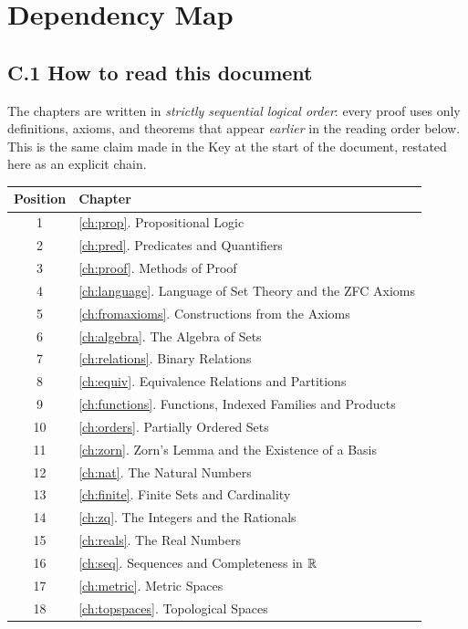 \chapter{Dependency Map}\label{ch:dependency}

\section*{C.1 How to read this document}

The chapters are written in \emph{strictly sequential logical order}: every proof uses only definitions, axioms, and theorems that appear \emph{earlier} in the reading order below. This is the same claim made in the Key at the start of the document, restated here as an explicit chain.

\begin{center}
\begin{tabular}{@{}cl@{}}
	\toprule
	\textbf{Position} & \textbf{Chapter}\\
	\midrule
	1 & \ref{ch:prop}. Propositional Logic\\
	2 & \ref{ch:pred}. Predicates and Quantifiers\\
	3 & \ref{ch:proof}. Methods of Proof\\
	4 & \ref{ch:language}. Language of Set Theory and the ZFC Axioms\\
	5 & \ref{ch:fromaxioms}. Constructions from the Axioms\\
	6 & \ref{ch:algebra}. The Algebra of Sets\\
	7 & \ref{ch:relations}. Binary Relations\\
	8 & \ref{ch:equiv}. Equivalence Relations and Partitions\\
	9 & \ref{ch:functions}. Functions, Indexed Families and Products\\
	10 & \ref{ch:orders}. Partially Ordered Sets\\
	11 & \ref{ch:zorn}. Zorn's Lemma and the Existence of a Basis\\
	12 & \ref{ch:nat}. The Natural Numbers\\
	13 & \ref{ch:finite}. Finite Sets and Cardinality\\
	14 & \ref{ch:zq}. The Integers and the Rationals\\
	15 & \ref{ch:reals}. The Real Numbers\\
	16 & \ref{ch:seq}. Sequences and Completeness in $\mathbb{R}$\\
	17 & \ref{ch:metric}. Metric Spaces\\
	18 & \ref{ch:topspaces}. Topological Spaces\\
	\bottomrule
\end{tabular}
\end{center}

